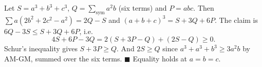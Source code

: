 Let $S=a^3+b^3+c^3$, $Q=\sum_{\text{sym}}a^2b$ (six terms) and $P=abc$. Then $\sum a(2b^2+2c^2-a^2)=2Q-S$ and $(a+b+c)^3=S+3Q+6P$. The claim is $6Q-3S\le S+3Q+6P$, i.e.
\[4S+6P-3Q=2(S+3P-Q)+(2S-Q)\ge0.\]
Schur's inequality gives $S+3P\ge Q$. And $2S\ge Q$ since $a^3+a^3+b^3\ge3a^2b$ by AM-GM, summed over the six terms. $\blacksquare$ Equality holds at $a=b=c$.
